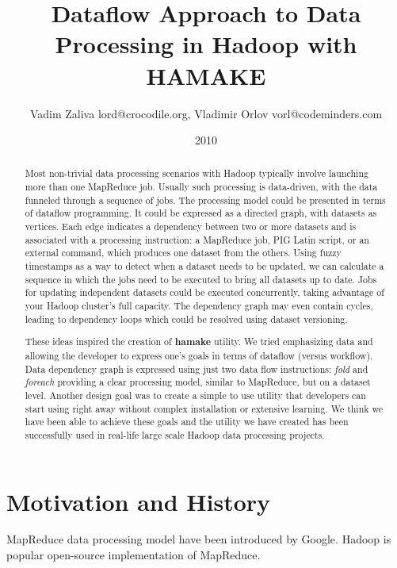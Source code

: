 \documentclass[11pt,twocolumn]{article}
\author{Vadim Zaliva lord@crocodile.org, Vladimir Orlov vorl@codeminders.com}
\date{2010}
\title{Dataflow Approach to Data Processing in Hadoop with HAMAKE}
\begin{document}
\lstset{language=XML,basicstyle=\tiny,markfirstintag=true,numbers=left, numberstyle=\tiny}

\maketitle

\begin{abstract}
  Most non-trivial data processing scenarios with Hadoop typically
  involve launching more than one MapReduce job. Usually such
  processing is data-driven, with the data funneled through a sequence
  of jobs. The processing model could be presented in terms of
  dataflow programming. It could be expressed as a directed graph,
  with datasets as vertices. Each edge indicates a dependency between
  two or more datasets and is associated with a processing
  instruction: a MapReduce job, PIG Latin script, or an external
  command, which produces one dataset from the others. Using fuzzy
  timestamps as a way to detect when a dataset needs to be updated, we
  can calculate a sequence in which the jobs need to be executed to
  bring all datasets up to date. Jobs for updating independent
  datasets could be executed concurrently, taking advantage of your
  Hadoop cluster's full capacity. The dependency graph may even
  contain cycles, leading to dependency loops which could be resolved
  using dataset versioning.

  These ideas inspired the creation of \textbf{hamake} utility. We
  tried emphasizing data and allowing the developer to express one's
  goals in terms of dataflow (versus workflow). Data dependency graph
  is expressed using just two data flow instructions: \emph{fold} and
  \emph{foreach} providing a clear processing model, similar to
  MapReduce, but on a dataset level. Another design goal was to create
  a simple to use utility that developers can start using right away
  without complex installation or extensive learning. We think we have
  been able to achieve these goals and the utility we have created has
  been successfully used in real-life large scale Hadoop data
  processing projects.
\end{abstract}

\section{Motivation and History}

MapReduce data processing model have been introduced by
Google\cite{dean2008map}. Hadoop\cite{bialecki2005hadoop} is popular
open-source implementation of MapReduce.
\end{document}
